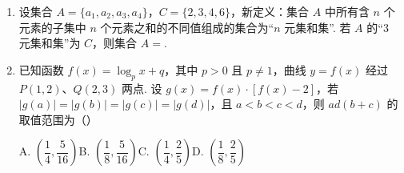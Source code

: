 
\begin{enumerate}

\item 设集合 $A=\{a_1,a_2,a_3,a_4\}$，$C=\{2,3,4,6\}$，新定义：集合 $A$ 中所有含 $n$ 个元素的子集中 $n$ 个元素之和的不同值组成的集合为“$n$ 元集和集”. 若 $A$ 的“3 元集和集”为 $C$，则集合 $A=$\blankline[4.4em].

\ifanswer
\solbegin
{}
\solend
\fi

\item 已知函数 $f(x)=\log_p x+q$，其中 $p>0$ 且 $p\ne1$，曲线 $y=f(x)$ 经过 $P(1,2)$、$Q(2,3)$ 两点. 设 $g(x)=f(x)\cdot[f(x)-2]$，若 $\lvert g(a)\rvert=\lvert g(b)\rvert=\lvert g(c)\rvert=\lvert g(d)\rvert$，且 $a<b<c<d$，则 $ad(b+c)$ 的取值范围为\mbox{（\quad）}

\keepwithprev
A. $\left(\dfrac14,\dfrac5{16}\right)$\qquad B. $\left(\dfrac18,\dfrac5{16}\right)$\qquad C. $\left(\dfrac14,\dfrac25\right)$\qquad D. $\left(\dfrac18,\dfrac25\right)$


\end{enumerate}
